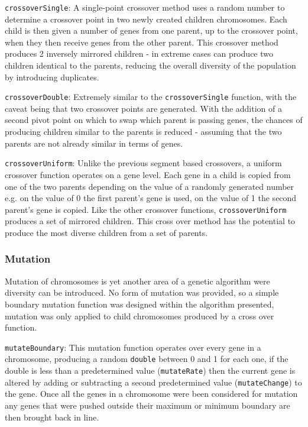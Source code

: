 			\texttt{crossoverSingle}: A single-point crossover method uses a random number to determine a crossover point in two newly created children chromosomes. Each child is then given a number of genes from one parent, up to the crossover point, when they then receive genes from the other parent. This crossover method produces 2 inversely mirrored children - in extreme cases can produce two children identical to the parents, reducing the overall diversity of the population by introducing duplicates. 
			
			\texttt{crossoverDouble}: Extremely similar to the  \texttt{crossoverSingle} function, with the caveat being that two crossover points are generated. With the addition of a second pivot point on which to swap which parent is passing genes, the chances of producing children similar to the parents is reduced - assuming that the two parents are not already similar in terms of genes.
			
			\texttt{crossoverUniform}: Unlike the previous segment based crossovers, a uniform crossover function operates on a gene level. Each gene in a child is copied from one of the two parents depending on the value of a randomly generated number e.g. on the value of 0 the first parent's gene is used, on the value of 1 the second parent's gene is copied. Like the other crossover functions, \texttt{crossoverUniform} produces a set of mirrored children. This cross over method has the potential to produce the most diverse children from a set of parents. 
			
		\subsubsection{Mutation}
			Mutation of chromosomes is yet another area of a genetic algorithm were diversity can be introduced. No form of mutation was provided, so a simple boundary mutation function was designed within the algorithm presented, mutation was only applied to child chromosomes produced by a cross over function.
			
			\texttt{mutateBoundary}: This mutation function operates over every gene in a chromosome, producing a random \texttt{double} between 0 and 1 for each one, if the double is less than a predetermined value (\texttt{mutateRate}) then the current gene is altered by adding  or subtracting a second predetermined value (\texttt{mutateChange}) to the gene. Once all the genes in a chromosome were been considered for mutation any genes that were pushed outside their maximum or minimum boundary are then brought back in line.
		
